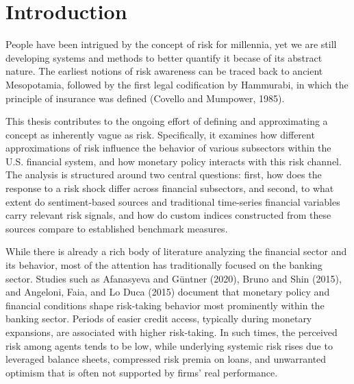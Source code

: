 \documentclass[12pt,a4paper]{report}
\begin{document}
\clearpage





\clearpage
{}
\fancyhead[LO]{}
\chapter*{Introduction}

People have been intrigued by the concept of risk for millennia, yet we are still 
developing systems and methods to better quantify it becase of its abstract nature. The earliest notions of risk 
awareness can be traced back to ancient Mesopotamia, followed by the first legal 
codification by Hammurabi, in which the principle of insurance was defined 
(Covello and Mumpower, 1985).

This thesis contributes to the ongoing effort of defining and approximating a concept as inherently vague as risk. Specifically, it examines how different approximations of risk influence the behavior of various subsectors within the U.S. financial system, and how monetary policy interacts with this risk channel. The analysis is structured around two central questions: first, how does the response to a risk shock differ across financial subsectors, and second, to what extent do sentiment-based sources and traditional time-series financial variables carry relevant risk signals, and how do custom indices constructed from these sources compare to established benchmark measures.


While there is already a rich body of literature analyzing the financial sector and its 
behavior, most of the attention has traditionally focused on the banking sector. Studies 
such as Afanasyeva and Güntner (2020), Bruno and Shin (2015), and Angeloni, Faia, and Lo Duca 
(2015) document that monetary policy and financial conditions shape risk-taking behavior 
most prominently within the banking sector. Periods of easier credit access, typically 
during monetary expansions, are associated with higher risk-taking. In such times, the 
perceived risk among agents tends to be low, while underlying systemic risk rises due to 
leveraged balance sheets, compressed risk premia on loans, and unwarranted optimism 
that is often not supported by firms' real performance.
\end{document}
